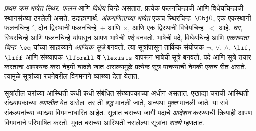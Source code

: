 \emph{प्रथम-क्रम भाषेत} \emph{स्थिर}, \emph{फलन} आणि \emph{विधेय} चिन्हे असतात. प्रत्येक फलनचिन्हाची आणि विधेयचिन्हाची स्थानसंख्या ठरलेली असते. उदाहरणार्थ, \emph{अंकगणिताच्या भाषेत} एकच स्थिरचिन्ह~$\Obj 0$, एक एकस्थानी फलनचिन्ह $\prime$, दोन द्विस्थानी फलनचिन्हे~$+$ आणि $\times$, आणि एक द्विस्थानी विधेयचिन्ह~$<$ आहे. \emph{चर}, स्थिरचिन्हे आणि फलनचिन्हे यांपासून आपण भाषेची \emph{पदे} बनवतो. भाषेची पदे, विधेयचिन्हे आणि \emph{एकरूपता चिन्ह}~$\eq$ यांच्या साहाय्याने \emph{आण्विक सूत्रे} बनवतो. त्या सूत्रांपासून तार्किक संयोजक $\lnot$, $\lor$, $\land$, $\lif$, $\liff$ आणि संख्यापक $\lforall$ व $\lexists$ वापरून भाषेची सूत्रे बनवतो. पदे आणि सूत्रे तयार करताना आवश्यक कंस नेहमी घातले जात असल्यामुळे प्रत्येक सूत्र वाचण्याची नेमकी एकच रीत असते. त्यामुळे सूत्रांच्या रचनेवरील विगमनाने व्याख्या देता येतात.

सूत्रांतील चरांच्या आस्थिती कधी कधी संबंधित संख्यापकाच्या अधीन असतात. एखाद्या चराची आस्थिती संख्यापकाच्या \emph{व्याप्तीत} येत असेल, तर ती \emph{बद्ध} मानली जाते, अन्यथा \emph{मुक्त} मानली जाते. या सर्व संकल्पनांच्या व्याख्या विगमनाधारित आहेत. सूत्रात चराच्या जागी पदाचे \emph{आदेशन} करण्याची क्रियाही आपण विगमनाने परिभाषित करतो. मुक्त चराच्या आस्थिती नसलेल्या सूत्रांना \emph{वाक्ये} म्हणतात.
